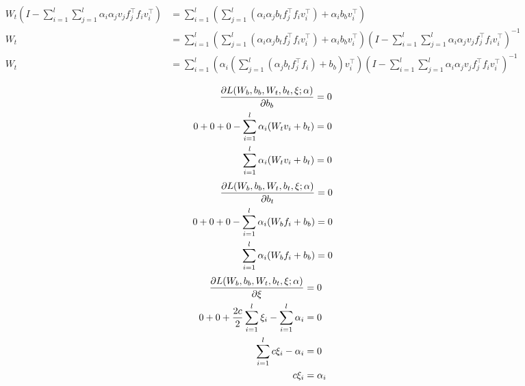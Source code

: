 \begin{equation}
\begin{aligned}
    W_t(I - \sum_{i=1}^{l}\sum_{j=1}^{l}\alpha_i\alpha_j v_j f_j^\top f_i v_i^\top) & = \sum_{i=1}^{l}(\sum_{j=1}^{l}(\alpha_i\alpha_j b_t f_j^\top f_i v_i^\top) + \alpha_i b_b v_i^\top)                                                                                   \\
    W_t                                                                             & = \sum_{i=1}^{l}(\sum_{j=1}^{l}(\alpha_i\alpha_j b_t f_j^\top f_i v_i^\top) + \alpha_i b_b v_i^\top) (I - \sum_{i=1}^{l}\sum_{j=1}^{l}\alpha_i\alpha_j v_j f_j^\top f_i v_i^\top)^{-1} \\
    W_t                                                                             & = \sum_{i=1}^{l}(\alpha_i(\sum_{j=1}^{l}(\alpha_j b_t f_j^\top f_i) + b_b)v_i^\top ) (I - \sum_{i=1}^{l}\sum_{j=1}^{l}\alpha_i\alpha_j v_j f_j^\top f_i v_i^\top)^{-1}                 \\
  \end{aligned}
\end{equation}
\begin{equation}
  \begin{aligned}
    \pdv{L(W_b,b_b,W_t,b_t,\xi;\alpha)}{b_b}        & = 0 \\
    0 + 0 + 0 - \sum_{i=1}^{l}\alpha_i(W_t v_i+b_t) & = 0 \\
    \sum_{i=1}^{l}\alpha_i(W_t v_i+b_t)             & = 0
  \end{aligned}
\end{equation}
\begin{equation}
  \begin{aligned}
    \pdv{L(W_b,b_b,W_t,b_t,\xi;\alpha)}{b_t}        & = 0 \\
    0 + 0 + 0 - \sum_{i=1}^{l}\alpha_i(W_b f_i+b_b) & = 0 \\
    \sum_{i=1}^{l}\alpha_i(W_b f_i+b_b)             & = 0
  \end{aligned}
\end{equation}
\begin{equation}
  \begin{aligned}
    \pdv{L(W_b,b_b,W_t,b_t,\xi;\alpha)}{\xi}                         & = 0        \\
    0 + 0 + \frac{2c}{2}\sum_{i=1}^{l}\xi_i - \sum_{i=1}^{l}\alpha_i & = 0        \\
    \sum_{i=1}^{l}c\xi_i - \alpha_i                                  & = 0        \\
    c\xi_i                                                           & = \alpha_i \\
  \end{aligned}
\end{equation}
